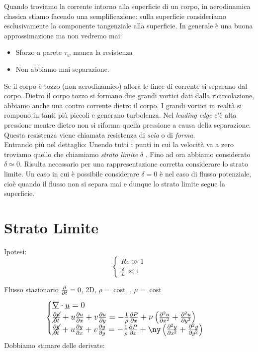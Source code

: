 Quando troviamo la corrente intorno alla superficie di un corpo, in aerodinamica classica stiamo facendo una semplificazione: sulla superficie consideriamo esclusivamente la componente tangenziale alla superficie.
In generale è una buona approssimazione ma non vedremo mai:
\begin{itemize}
\item Sforzo a parete $ \tau _w $ manca la resistenza
\item Non abbiamo mai separazione.
\end{itemize}
Se il corpo è tozzo (non aerodinamico) allora le linee di corrente si separano dal corpo.
Dietro il corpo tozzo si formano due grandi vortici dati dalla ricircolazione, abbiamo anche una contro corrente dietro il corpo.
I grandi vortici in realtà si rompono in tanti più piccoli e generano turbolenza.
Nel \textit{leading edge} c'è alta pressione mentre dietro non si riforma quella pressione a causa della separazione.
Questa resistenza viene chiamata resistenza di \emph{scia} o di \emph{forma}.\\

Entrando più nel dettaglio:
Unendo tutti i punti in cui la velocità va a zero troviamo quello che chiamiamo \emph{strato limite} $ \delta  $ .
Fino ad ora abbiamo considerato $ \delta \simeq 0 $. Risulta necessario per una rappresentazione corretta considerare lo strato limite. Un caso in cui è possibile considerare $ \delta =0 $ è nel caso di flusso potenziale, cioè quando il flusso non si separa mai e dunque lo strato limite segue la superficie.\\

\section{Strato Limite}
Ipotesi:
\[
  \begin{cases}
    Re\gg 1\\
    \frac{\delta}{L}\ll 1
  \end{cases}
\]
\begin{figure}[H]
    \centering
    \caption{}
    \label{fig:strato_lim}
\end{figure}
Flusso stazionario $ \frac{\partial}{\partial t}=0  $, 2D, $ \rho =\operatorname{cost}  $ , $ \mu =\operatorname{cost}  $
\begin{equation*}
  \large
  \begin{cases}
  \underline{\nabla}\cdot \underline{u}=0\\
  \cancel{\pdev{u}{t}}+ u \pdev{u}{x} + v \pdev{u}{y}=-\frac{1}{\rho }\pdev{P}{x}+\nu \left( \pdev{^2u}{x^2}+\pdev{^2u}{y^2}\right) \\
  \cancel{\pdev{y}{t}}+ u \pdev{y}{x} + v \pdev{y}{y}=-\frac{1}{\rho }\pdev{P}{x}+\ny \left( \pdev{^2y}{x^2}+\pdev{^2y}{y^2}\right) \\
  \end{cases}
\end{equation*}
Dobbiamo stimare delle derivate:

